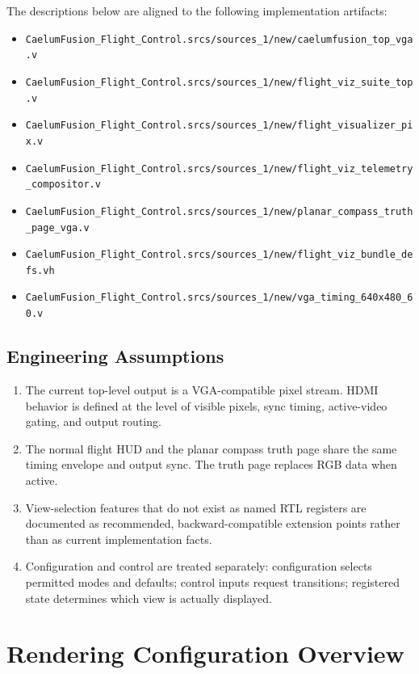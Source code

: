 \documentclass[letterpaper, final, onecolumn, titlepage]{article}
\DeclareRobustCommand{\rtlfile}[1]{\nolinkurl{#1}}
\begin{document}
The descriptions below are aligned to the following implementation artifacts:

\begin{itemize}[leftmargin=*]
  \item \rtlfile{CaelumFusion_Flight_Control.srcs/sources_1/new/caelumfusion_top_vga.v}
  \item \rtlfile{CaelumFusion_Flight_Control.srcs/sources_1/new/flight_viz_suite_top.v}
  \item \rtlfile{CaelumFusion_Flight_Control.srcs/sources_1/new/flight_visualizer_pix.v}
  \item \rtlfile{CaelumFusion_Flight_Control.srcs/sources_1/new/flight_viz_telemetry_compositor.v}
  \item \rtlfile{CaelumFusion_Flight_Control.srcs/sources_1/new/planar_compass_truth_page_vga.v}
  \item \rtlfile{CaelumFusion_Flight_Control.srcs/sources_1/new/flight_viz_bundle_defs.vh}
  \item \rtlfile{CaelumFusion_Flight_Control.srcs/sources_1/new/vga_timing_640x480_60.v}
\end{itemize}

\subsection{Engineering Assumptions}

\begin{enumerate}[leftmargin=*]
  \item The current top-level output is a VGA-compatible pixel stream. HDMI
  behavior is defined at the level of visible pixels, sync timing, active-video
  gating, and output routing.
  \item The normal flight HUD and the planar compass truth page share the same
  timing envelope and output sync. The truth page replaces RGB data when active.
  \item View-selection features that do not exist as named RTL registers are
  documented as recommended, backward-compatible extension points rather than as
  current implementation facts.
  \item Configuration and control are treated separately: configuration selects
  permitted modes and defaults; control inputs request transitions; registered
  state determines which view is actually displayed.
\end{enumerate}

\section{Rendering Configuration Overview}
\end{document}
